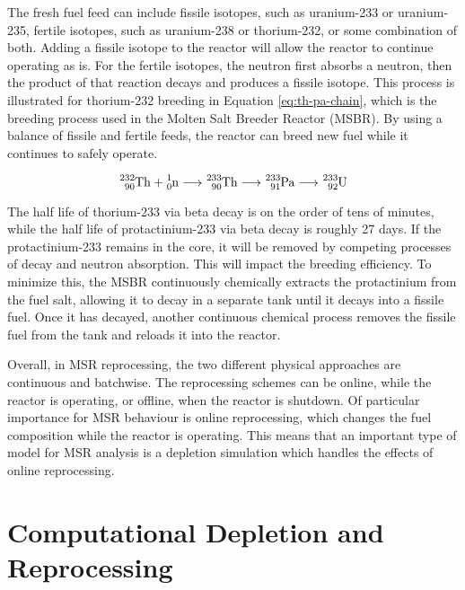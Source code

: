 The fresh fuel feed can include fissile isotopes, such as uranium-233 or uranium-235, fertile isotopes, such as uranium-238 or thorium-232, or some combination of both. Adding a fissile isotope to the reactor will allow the reactor to continue operating as is. For the fertile isotopes, the neutron first absorbs a neutron, then the product of that reaction decays and produces a fissile isotope. This process is illustrated for thorium-232 breeding in Equation \eqref{eq:th-pa-chain}, which is the breeding process used in the Molten Salt Breeder Reactor (MSBR). By using a balance of fissile and fertile feeds, the reactor can breed new fuel while it continues to safely operate.

\begin{equation} \hfill
\ce{^{232}_{90}Th} + \ce{^{1}_{0}n} \longrightarrow \ce{^{233}_{90}Th} \longrightarrow \ce{^{233}_{91}Pa} \longrightarrow \ce{^{233}_{92}U}
\hfill\label{eq:th-pa-chain} \end{equation}

The half life of thorium-233 via beta decay is on the order of tens of minutes, while the half life of protactinium-233 via beta decay is roughly 27 days.
If the protactinium-233 remains in the core, it will be removed by competing processes of decay and neutron absorption.
This will impact the breeding efficiency.
To minimize this, the MSBR continuously chemically extracts the protactinium from the fuel salt, allowing it to decay in a separate tank until it decays into a fissile fuel.
Once it has decayed, another continuous chemical process removes the fissile fuel from the tank and reloads it into the reactor.

Overall, in MSR reprocessing, the two different physical approaches are continuous and batchwise. The reprocessing schemes can be online, while the reactor is operating, or offline, when the reactor is shutdown. Of particular importance for MSR behaviour is online reprocessing, which changes the fuel composition while the reactor is operating. This means that an important type of model for MSR analysis is a depletion simulation which handles the effects of online reprocessing.

\section{Computational Depletion and Reprocessing}

